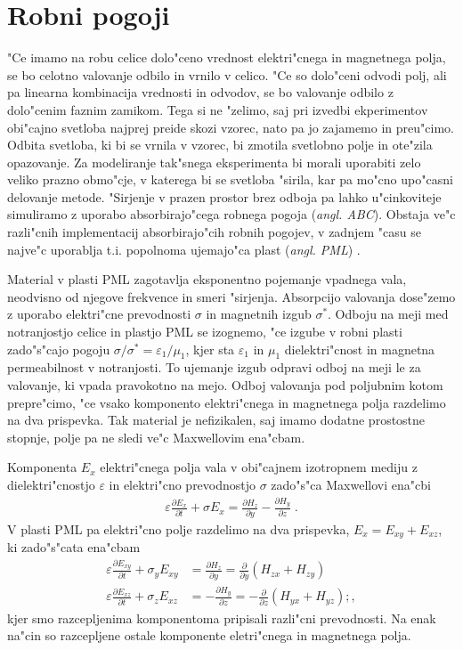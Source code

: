 \documentclass[12pt,twoside,openright,final]{report}
\newcommand{\odvod}[2]{\frac{\partial #1}{\partial #2}}
\newcommand{\eps}{\varepsilon}
\newcommand{\angl}[1]{(\textit{angl. #1})}
\begin{document}
\section{Robni pogoji}

"Ce imamo na robu celice dolo"ceno vrednost elektri"cnega in magnetnega polja, se bo celotno valovanje odbilo in vrnilo v celico. 
"Ce so dolo"ceni odvodi polj, ali pa linearna kombinacija vrednosti in odvodov, se bo valovanje odbilo z dolo"cenim faznim zamikom. 
Tega si ne "zelimo, saj pri izvedbi ekperimentov obi"cajno svetloba najprej preide skozi vzorec, nato pa jo zajamemo in preu"cimo. 
Odbita svetloba, ki bi se vrnila v vzorec, bi zmotila svetlobno polje in ote"zila opazovanje. 
Za modeliranje tak"snega eksperimenta bi morali uporabiti zelo veliko prazno obmo"cje, v katerega bi se svetloba "sirila, kar pa mo"cno upo"casni delovanje metode. 
"Sirjenje v prazen prostor brez odboja pa lahko u"cinkoviteje simuliramo z uporabo absorbirajo"cega robnega pogoja \angl{\ac{ABC}}. 
Obstaja ve"c razli"cnih implementacij absorbirajo"cih robnih pogojev, v zadnjem "casu se najve"c uporablja t.i. popolnoma ujemajo"ca plast \angl{\ac{PML}} \cite{taflove,berenger}. 

Material v plasti \acs{PML} zagotavlja eksponentno pojemanje vpadnega vala, neodvisno od njegove frekvence in smeri "sirjenja. 
Absorpcijo valovanja dose"zemo z uporabo elektri"cne prevodnosti $\sigma$ in magnetnih izgub $\sigma^\ast$. 
Odboju na meji med notranjostjo celice in plastjo \acs{PML} se izognemo, "ce izgube v robni plasti zado"s"cajo pogoju $\sigma/\sigma^\ast = \eps_1/\mu_1$, kjer sta $\eps_1$ in $\mu_1$ dielektri"cnost in magnetna permeabilnost v notranjosti. 
To ujemanje izgub odpravi odboj na meji le za valovanje, ki vpada pravokotno na mejo. 
Odboj valovanja pod poljubnim kotom prepre"cimo, "ce vsako komponento elektri"cnega in magnetnega polja razdelimo na dva prispevka. 
Tak material je nefizikalen, saj imamo dodatne prostostne stopnje, polje pa ne sledi ve"c Maxwellovim ena"cbam. 

Komponenta $E_x$ elektri"cnega polja vala v obi"cajnem izotropnem mediju z dielektri"cnostjo $\eps$ in elektri"cno prevodnostjo $\sigma$ zado"s"ca Maxwellovi ena"cbi
\begin{align}
 \eps \odvod{E_x}{t} + \sigma E_x = \odvod{H_z}{y} - \odvod{H_y}{z}\;.
\end{align}
V plasti \acs{PML} pa elektri"cno polje razdelimo na dva prispevka, $E_x = E_{xy} + E_{xz}$, ki zado"s"cata ena"cbam
\begin{align}
 \eps \odvod{E_{xy}}{t} + \sigma_y E_{xy} &= \odvod{H_z}{y} = \odvod{}{y}(H_{zx} + H_{zy}) \\
 \eps \odvod{E_{xz}}{t} + \sigma_z E_{xz} &= -\odvod{H_y}{z} = -\odvod{}{z}(H_{yx} + H_{yz});,
\end{align}
kjer smo razcepljenima komponentoma pripisali razli"cni prevodnosti. 
Na enak na"cin so razcepljene ostale komponente eletri"cnega in magnetnega polja. 
\end{document}
